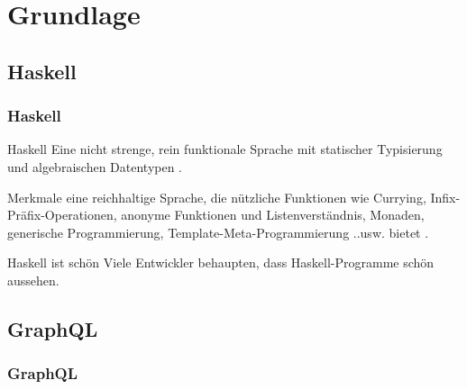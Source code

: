 
\section{Grundlage}

\subsection{Haskell}
\begin{frame}{}
    \frametitle{Haskell}
\end{frame}

\begin{frame}{}

    \footnotesize

    \begin{block}{Haskell}
        Eine \alert{nicht strenge}, \alert{rein funktionale} Sprache mit statischer 
        Typisierung und algebraischen Datentypen \cite{history-of-haskell}.
    \end{block}

    \begin{block}{Merkmale}
        eine reichhaltige Sprache, die nützliche Funktionen wie 
        Currying, Infix-Präfix-Operationen, anonyme Funktionen und
        Listenverständnis, Monaden, 
        generische Programmierung, 
        Template-Meta-Programmierung 
        ..usw. bietet \cite{history-of-haskell}.
    \end{block}

    \begin{block}{Haskell ist schön}
        Viele Entwickler behaupten, dass Haskell-Programme schön aussehen. 
        \cite{history-of-haskell} 
    \end{block}

\end{frame}


\subsection{GraphQL}
\begin{frame}{}
    \frametitle{GraphQL}
\end{frame}


